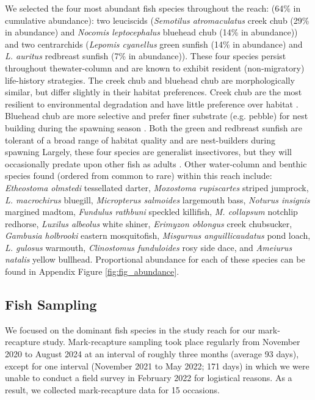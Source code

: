 \documentclass[11pt, class=article, crop=false]{standalone}
\begin{document}
We selected the four most abundant fish species throughout the reach: (64\% in cumulative abundance): two leuciscids (\textit{Semotilus atromaculatus} creek chub (29\% in abundance) and \textit{Nocomis leptocephalus} bluehead chub  (14\% in abundance)) and two centrarchids (\textit{Lepomis cyanellus} green sunfish (14\% in abundance) and \textit{L. auritus} redbreast sunfish (7\% in abundance)). These four species persist throughout thewater-column and are known to exhibit resident (non-migratory) life-history strategies\citep{teruiNonrandomDispersalSympatric2021}. The creek chub and bluehead chub are morphologically similar, but differ slightly in their habitat preferences. Creek chub are the most resilient to environmental degradation and have little preference over habitat \citep{ mccormick 2001, bramblett 2005}. Bluehead chub are more selective and prefer finer substrate (e.g. pebble) for nest building during the spawning season \citep{evelyn 2023 }. Both the green and redbreast sunfish are tolerant of a broad range of habitat quality and are nest-builders during spawning \citep{wernerCompetitionHabitatShift1977, helms, etnier and starnes} Largely, these four species are generalist insectivores, but they will occasionally predate upon other fish as adults \citep{wernerCompetitionHabitatShift1977, teruiNonrandomDispersalSympatric2021, helms 2018, etnier and starnes 1993}. Other water-column and benthic species found (ordered from common to rare) within this reach include: \textit{Etheostoma olmstedi} tessellated darter, \textit{Moxostoma rupiscartes} striped jumprock, \textit{L. macrochirus} bluegill, \textit{Micropterus salmoides} largemouth bass, \textit{Noturus insignis} margined madtom, \textit{Fundulus rathbuni} speckled killifish, \textit{M. collapsum} notchlip redhorse, \textit{Luxilus albeolus} white shiner, \textit{Erimyzon oblongus} creek chubsucker, \textit{Gambusia holbrooki} eastern mosquitofish, \textit{Misgurnus anguillicaudatus} pond loach, \textit{L. gulosus} warmouth, \textit{Clinostomus funduloides} rosy side dace, and \textit{Ameiurus natalis} yellow bullhead. Proportional abundance for each of these species can be found in Appendix Figure \ref{fig:fig_abundance}.

\subsection{Fish Sampling}

We focused on the dominant fish species in the study reach for our mark-recapture study. Mark-recapture sampling took place regularly from November 2020 to August 2024 at an interval of roughly three months (average 93 days), except for one interval (November 2021 to May 2022; 171 days) in which we were unable to conduct a field survey in February 2022 for logistical reasons. As a result, we collected mark-recapture data for 15 occasions.
\end{document}
